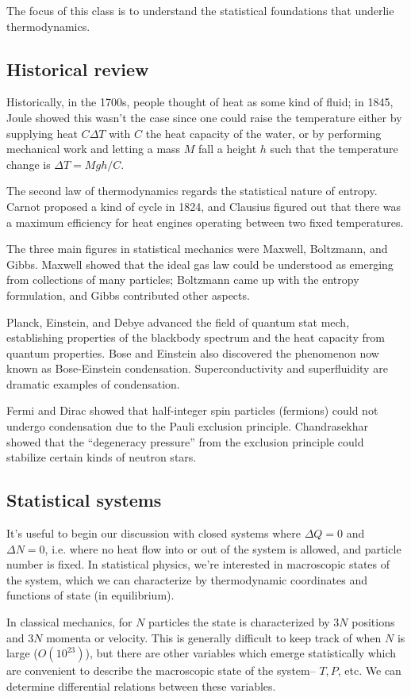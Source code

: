 The focus of this class is to understand the statistical foundations that underlie thermodynamics. 
\subsection*{Historical review}
Historically, in the 1700s, people thought of heat as some kind of fluid; in 1845, Joule showed this wasn't the case since one could raise the temperature either by supplying heat $C\Delta T$ with $C$ the heat capacity of the water, or by performing mechanical work and letting a mass $M$ fall a height $h$ such that the temperature change is $\Delta T=Mgh/C$.

The second law of thermodynamics regards the statistical nature of entropy. Carnot proposed a kind of cycle in 1824, and Clausius figured out that there was a maximum efficiency for heat engines operating between two fixed temperatures.

The three main figures in statistical mechanics were Maxwell, Boltzmann, and Gibbs. Maxwell showed that the ideal gas law could be understood as emerging from collections of many particles; Boltzmann came up with the entropy formulation, and Gibbs contributed other aspects.

Planck, Einstein, and Debye advanced the field of quantum stat mech, establishing properties of the blackbody spectrum and the heat capacity from quantum properties. Bose and Einstein also discovered the phenomenon now known as Bose-Einstein condensation. Superconductivity and superfluidity are dramatic examples of condensation.

Fermi and Dirac showed that half-integer spin particles (fermions) could not undergo condensation due to the Pauli exclusion principle. Chandrasekhar showed that the ``degeneracy pressure'' from the exclusion principle could stabilize certain kinds of neutron stars.

\subsection*{Statistical systems}
It's useful to begin our discussion with closed systems where $\Delta Q=0$ and $\Delta N=0$, i.e. where no heat flow into or out of the system is allowed, and particle number is fixed. In statistical physics, we're interested in macroscopic states of the system, which we can characterize by thermodynamic coordinates and functions of state (in equilibrium).

In classical mechanics, for $N$ particles the state is characterized by $3N$ positions and $3N$ momenta or velocity. This is generally difficult to keep track of when $N$ is large ($O(10^{23})$), but there are other variables which emerge statistically which are convenient to describe the macroscopic state of the system-- $T, P$, etc. We can determine differential relations between these variables.

